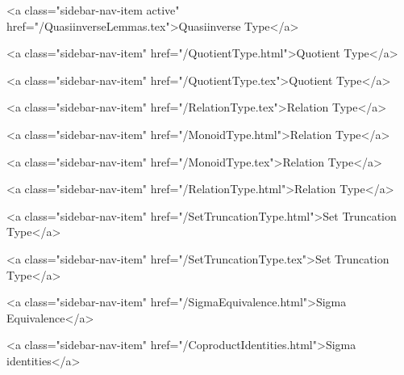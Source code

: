       
    
      
        
          <a class="sidebar-nav-item active" href="/QuasiinverseLemmas.tex">Quasiinverse Type</a>
        
      
    
      
        
          <a class="sidebar-nav-item" href="/QuotientType.html">Quotient Type</a>
        
      
    
      
        
          <a class="sidebar-nav-item" href="/QuotientType.tex">Quotient Type</a>
        
      
    
      
        
          <a class="sidebar-nav-item" href="/RelationType.tex">Relation Type</a>
        
      
    
      
        
          <a class="sidebar-nav-item" href="/MonoidType.html">Relation Type</a>
        
      
    
      
        
          <a class="sidebar-nav-item" href="/MonoidType.tex">Relation Type</a>
        
      
    
      
        
          <a class="sidebar-nav-item" href="/RelationType.html">Relation Type</a>
        
      
    
      
        
          <a class="sidebar-nav-item" href="/SetTruncationType.html">Set Truncation Type</a>
        
      
    
      
        
          <a class="sidebar-nav-item" href="/SetTruncationType.tex">Set Truncation Type</a>
        
      
    
      
        
          <a class="sidebar-nav-item" href="/SigmaEquivalence.html">Sigma Equivalence</a>
        
      
    
      
        
          <a class="sidebar-nav-item" href="/CoproductIdentities.html">Sigma identities</a>
        
